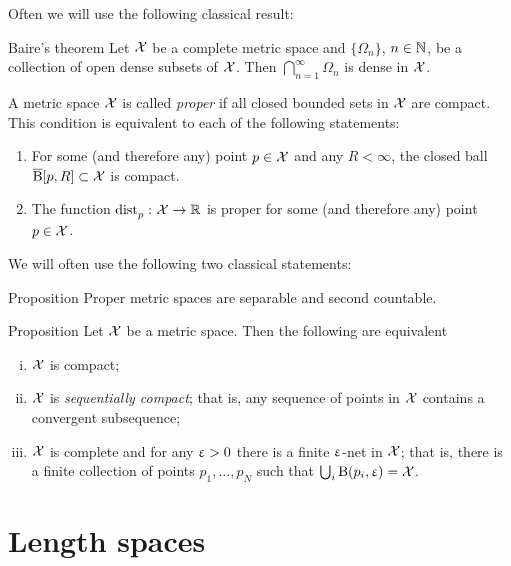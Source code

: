 Often we will use the following classical result:

\begin{thm}{Baire's theorem}
Let $\mathcal{X}$ be a complete metric space 
and $\{\Omega_n\}$, $n\in \NN$, be a collection of open dense subsets of $\mathcal{X}$.
Then $\bigcap_{n=1}^\infty\Omega_n$ is dense in $\mathcal{X}$.
\end{thm}
 

A metric space $\mathcal{X}$ is called \emph{proper} if all closed bounded sets in $\mathcal{X}$ are compact. 
This condition is equivalent to each of the following statements:
\begin{enumerate}
\item For some (and therefore any) point $p\in \spc{X}$ and any $R<\infty$, 
the closed ball $\cBall[p,R]\subset\spc{X}$ is compact. 
\item The function $\distfun{p}{}{}\:\spc{X}\to\RR$ is proper for some (and therefore any) point $p\in \spc{X}$.
\end{enumerate}

We will often use the following two classical statements:

\begin{thm}{Proposition}
Proper metric spaces are separable and second countable.
\end{thm}



\begin{thm}{Proposition}\label{compact=seq-compact}
Let $\mathcal{X}$ be a metric space. Then the following are equivalent
\begin{enumerate}[i)]
\item $\mathcal{X}$ is compact;
\item $\mathcal{X}$ is \emph{sequentially compact}; that is, any sequence of points in $\mathcal{X}$ contains a convergent subsequence;
\item $\mathcal{X}$ is complete and for any $\upvarepsilon>0$ there is a finite $\upvarepsilon$-net  in $\mathcal{X}$; that is, there is a finite collection of points $p_1,\ldots,p_{N}$ such that $\bigcup_i\mathrm{B}{}(p_i,\upvarepsilon)=\mathcal{X}$.
\end{enumerate}
\end{thm}

\section{Length spaces}\label{sec:intrinsic}

